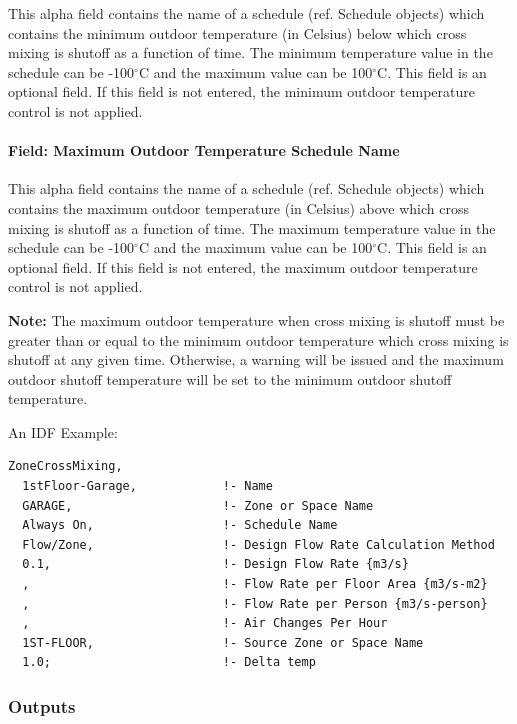 This alpha field contains the name of a schedule (ref. Schedule objects) which contains the minimum outdoor temperature (in Celsius) below which cross mixing is shutoff as a function of time. The minimum temperature value in the schedule can be -100$^\circ$C and the maximum value can be 100$^\circ$C. This field is an optional field. If this field is not entered, the minimum outdoor temperature control is not applied.

\paragraph{Field: Maximum Outdoor Temperature Schedule Name}\label{field-maximum-outdoor-temperature-schedule-name-3}

This alpha field contains the name of a schedule (ref. Schedule objects) which contains the maximum outdoor temperature (in Celsius) above which cross mixing is shutoff as a function of time. The maximum temperature value in the schedule can be -100$^\circ$C and the maximum value can be 100$^\circ$C. This field is an optional field. If this field is not entered, the maximum outdoor temperature control is not applied.

\textbf{Note:} The maximum outdoor temperature when cross mixing is shutoff must be greater than or equal to the minimum outdoor temperature which cross mixing is shutoff at any given time. Otherwise, a warning will be issued and the maximum outdoor shutoff temperature will be set to the minimum outdoor shutoff temperature.

An IDF Example:

\begin{lstlisting}
ZoneCrossMixing,
  1stFloor-Garage,            !- Name
  GARAGE,                     !- Zone or Space Name
  Always On,                  !- Schedule Name
  Flow/Zone,                  !- Design Flow Rate Calculation Method
  0.1,                        !- Design Flow Rate {m3/s}
  ,                           !- Flow Rate per Floor Area {m3/s-m2}
  ,                           !- Flow Rate per Person {m3/s-person}
  ,                           !- Air Changes Per Hour
  1ST-FLOOR,                  !- Source Zone or Space Name
  1.0;                        !- Delta temp
\end{lstlisting}

\subsubsection{Outputs}\label{outputs-4-000}

